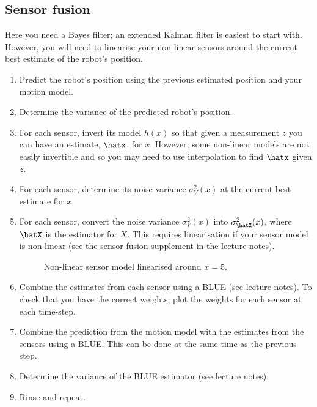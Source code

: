 \documentclass[a4paper, 12]{article}
\newcommand{\est}[1]{\expandafter\hat#1}
\newcommand{\var}[1]{\sigma_{#1}^2}
\begin{document}
\subsection{Sensor fusion}


Here you need a Bayes filter; an extended Kalman filter is easiest to
start with.  However, you will need to linearise your non-linear
sensors around the current best estimate of the robot's position.

\begin{enumerate}
\item Predict the robot's position using the previous estimated
  position and your motion model.

\item Determine the variance of the predicted robot's position.  
  
\item For each sensor, invert its model $h(x)$ so that given a
  measurement $z$ you can have an estimate, $\est{x}$, for $x$.
  However, some non-linear models are not easily invertible and so you
  may need to use interpolation to find $\est{x}$ given $z$.

\item For each sensor, determine its noise variance $\var{V}(x)$ at
  the current best estimate for $x$.

\item For each sensor, convert the noise variance $\var{V}(x)$ into
  $\var{\est{X}}(x)$, where $\est{X}$ is the estimator for $X$.  This
  requires linearisation if your sensor model is non-linear (see the
  sensor fusion supplement in the lecture notes).

  \begin{figure}[!h]
  \centering
  
  \caption{Non-linear sensor model linearised around $x=5$.}
  \label{fig:linearised}
  \end{figure}
  
\item Combine the estimates from each sensor using a BLUE (see lecture
  notes).  To check that you have the correct weights, plot the
  weights for each sensor at each time-step.

\item Combine the prediction from the motion model with the estimates
  from the sensors using a BLUE.  This can be done at the same time as
  the previous step.

\item Determine the variance of the BLUE estimator (see lecture
  notes).

\item Rinse and repeat.
\end{enumerate}
\end{document}
